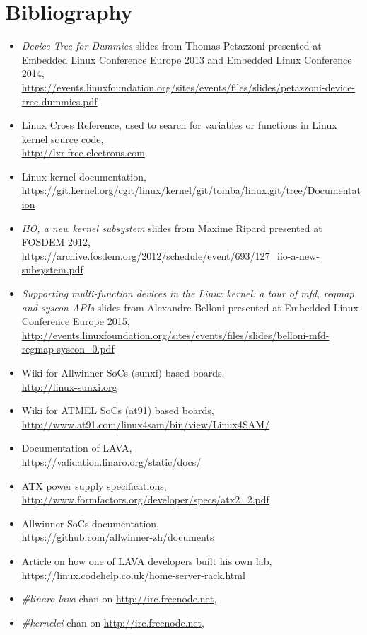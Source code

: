 \chapter*{Bibliography}

\begin{itemize}
  \item \textit{Device Tree for Dummies} slides from Thomas Petazzoni presented at Embedded Linux Conference Europe 2013 and Embedded Linux Conference 2014,\\
\url{https://events.linuxfoundation.org/sites/events/files/slides/petazzoni-device-tree-dummies.pdf}
  \item Linux Cross Reference, used to search for variables or functions in Linux kernel source code,\\
\url{http://lxr.free-electrons.com}
  \item Linux kernel documentation,\\
\url{https://git.kernel.org/cgit/linux/kernel/git/tomba/linux.git/tree/Documentation}
  \item \textit{IIO, a new kernel subsystem} slides from Maxime Ripard presented at FOSDEM 2012,\\
\url{https://archive.fosdem.org/2012/schedule/event/693/127\_iio-a-new-subsystem.pdf}
  \item \textit{Supporting multi-function devices in the Linux kernel: a tour of mfd, regmap and syscon APIs} slides from Alexandre Belloni presented at Embedded Linux Conference Europe 2015,\\
\url{http://events.linuxfoundation.org/sites/events/files/slides/belloni-mfd-regmap-syscon\_0.pdf}
  \item Wiki for Allwinner SoCs (sunxi) based boards,\\
\url{http://linux-sunxi.org}
  \item Wiki for ATMEL SoCs (at91) based boards,\\
\url{http://www.at91.com/linux4sam/bin/view/Linux4SAM/}
  \item Documentation of LAVA,\\
\url{https://validation.linaro.org/static/docs/}
  \item ATX power supply specifications,\\
\url{http://www.formfactors.org/developer/specs/atx2\_2.pdf}
  \item Allwinner SoCs documentation,\\
\url{https://github.com/allwinner-zh/documents}
  \item Article on how one of LAVA developers built his own lab,\\
\url{https://linux.codehelp.co.uk/home-server-rack.html}
  \item \textit{\#linaro-lava} chan on \url{http://irc.freenode.net},
  \item \textit{\#kernelci} chan on \url{http://irc.freenode.net},
\end{itemize}
